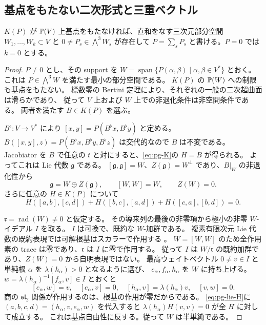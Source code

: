 \subsection{基点をもたない二次形式と三重ベクトル}
\begin{lemma}\label{lem:pg-quadratic-lie}
$K(P)$ が $\mathbb P(V)$ 上基点をもたなければ、直和をなす三次元部分空間
$W_1,\ldots,W_k\subset V$ と $0\neq P_s\in\bigwedge^3W_s$ が存在して
$P=\sum_sP_s$ と書ける。$P=0$ では $k=0$ とする。
\end{lemma}
\begin{proof}
$P\neq0$ とし、その support を
$W=\operatorname{span}\{P(\alpha,\beta)\mid\alpha,\beta\in V^*\}$ とおく。
これは $P\in\bigwedge^3W$ を満たす最小の部分空間である。
$K(P)$ の $\mathbb P(W)$ への制限も基点をもたない。
標数零の Bertini 定理により、それぞれの一般の二次超曲面は滑らかであり、
従って $V$ 上および $W$ 上での非退化条件は非空開条件である。
両者を満たす $B\in K(P)$ を選ぶ。

$B^\flat:V\to V^*$ により $[x,y]=P(B^\flat x,B^\flat y)$ と定める。
$B([x,y],z)=P(B^\flat x,B^\flat y,B^\flat z)$ は交代的なので $B$ は不変である。
Jacobiator を $B$ で任意の $t$ と対にすると、\eqref{eq:pg-K}の $H=B$ が得られる。
よってこれは Lie 代数 $\mathfrak g$ である。
$[\mathfrak g,\mathfrak g]=W$、$Z(\mathfrak g)=W^\perp$ であり、$B|_W$ の非退化性から
\[
\mathfrak g=W\oplus Z(\mathfrak g),\qquad [W,W]=W,\qquad Z(W)=0.
\]
さらに任意の $H\in K(P)$ について
\begin{equation}
H([a,b],[c,d])+H([b,c],[a,d])+H([c,a],[b,d])=0.\label{eq:pg-lie-H}
\end{equation}

$\mathfrak r=\operatorname{rad}(W)\neq0$ と仮定する。
その導来列の最後の非零項から極小の非零 $W$-イデアル $I$ を取る。
$I$ は可換で、既約な $W$-加群である。
複素有限次元 Lie 代数の既約表現では可解根基はスカラーで作用する
\cite[Proposition 16.9]{PEtingofLie}。
$W=[W,W]$ のため全作用素の trace は零であり、$\mathfrak r$ は $I$ に零で作用する。
従って $I$ は $W/\mathfrak r$ の既約加群であり、$Z(W)=0$ から自明表現ではない。
最高ウェイトベクトル $0\neq v\in I$ と単純根 $\alpha$ を
$\lambda(h_\alpha)>0$ となるように選び、
$e_\alpha,f_\alpha,h_\alpha$ を $W$ に持ち上げる。
$w=\lambda(h_\alpha)^{-1}[f_\alpha,v]\in I$ とおくと
\[
[e_\alpha,w]=v,\quad [e_\alpha,v]=0,\quad
[h_\alpha,v]=\lambda(h_\alpha)v,\quad[v,w]=0.
\]
商の $\mathfrak{sl}_2$ 関係が作用するのは、根基の作用が零だからである。
\eqref{eq:pg-lie-H}に $(a,b,c,d)=(h_\alpha,v,e_\alpha,w)$ を代入すると
$\lambda(h_\alpha)H(v,v)=0$ が全 $H$ に対して成立する。
これは基点自由性に反する。従って $W$ は半単純である。


\end{proof}

